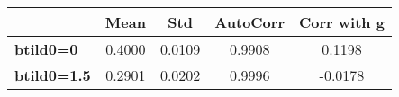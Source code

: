 \begin{tiny}\begin{tabular}{|l|c|c|c|c|}
\hline
&\textbf{Mean}&\textbf{Std}&\textbf{AutoCorr}&\textbf{Corr with g}\\\hline
\textbf{btild0=0}&0.4000&0.0109&0.9908&0.1198\\\hline
\textbf{btild0=1.5}&0.2901&0.0202&0.9996&-0.0178\\\hline
\end{tabular}
\end{tiny}